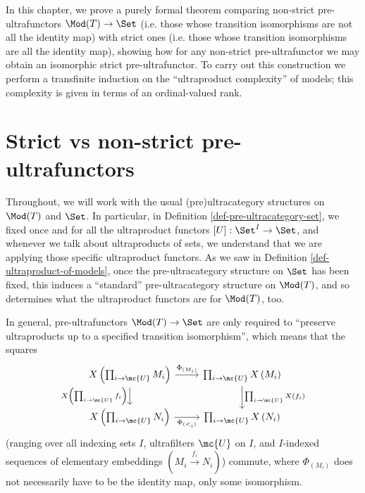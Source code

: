 In this chapter, we prove a purely formal theorem comparing non-strict pre-ultrafunctors $\Mod(T) \to \Set$ (i.e. those whose transition isomorphisms are not all the identity map) with strict ones (i.e. those whose transition isomorphisms are all the identity map), showing how for any non-strict pre-ultrafunctor we may obtain an isomorphic strict pre-ultrafunctor. To carry out this construction we perform a transfinite induction on the ``ultraproduct complexity'' of models; this complexity is given in terms of an ordinal-valued rank.

\section{Strict vs non-strict pre-ultrafunctors}
Throughout, we will work with the usual (pre)ultracategory structures on $\Mod(T)$ and $\Set$. In particular, in Definition \ref{def-pre-ultracategory-set}, we fixed once and for all the ultraproduct functors $[U] : \Set^I \to \Set$, and whenever we talk about ultraproducts of sets, we understand that we are applying those specific ultraproduct functors. As we saw in Definition \ref{def-ultraproduct-of-models}, once the pre-ultracategory structure on $\Set$ has been fixed, this induces a ``standard'' pre-ultracategory structure on $\Mod(T)$, and so determines what the ultraproduct functors are for $\Mod(T)$, too.

In general, pre-ultrafunctors $\Mod(T) \to \Set$ are only required to ``preserve ultraproducts up to a specified transition isomorphism'', which means that the squares
$$
\begin{tikzcd}[ampersand replacement = \&]
X \left(\prod_{i \to \mc{U}} M_i\right) \arrow{r}{\Phi_{(M_i)}} \arrow[swap]{d}{X \left(\prod_{i \to \mc{U}} f_i \right)}  \& \prod_{i \to \mc{U}} X\left(M_i \right) \arrow{d}{\prod_{i \to \mc{U}} X \left(f_i\right)} \\
X \left(\prod_{i \to \mc{U}} N_i \right) \arrow[swap]{r}{\Phi_{(<_i)}}   \& \prod_{i \to \mc{U}} X \left( N_i \right)
\end{tikzcd}
$$
(ranging over all indexing sets $I$, ultrafilters $\mc{U}$ on $I$, and $I$-indexed sequences of elementary embeddings $(M_i \overset{f_i}{\to} N_i)$) commute, where $\Phi_{(M_i)}$ does not necessarily have to be the identity map, only some isomorphism.


